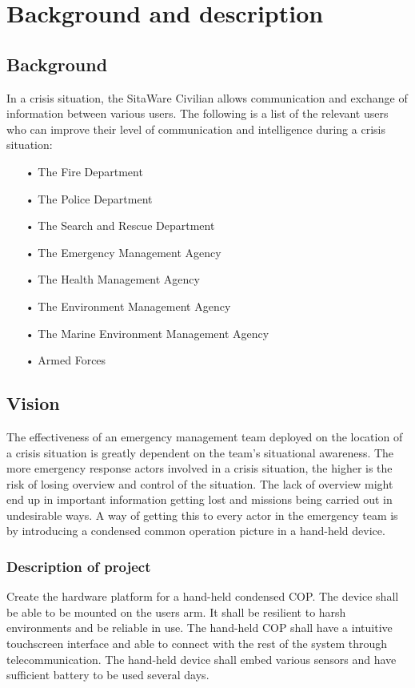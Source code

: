 \chapter{Background and description}
\section{Background}
In a crisis situation, the SitaWare Civilian allows communication and exchange of information between various users. The following is a list of the relevant users who can improve their level of communication and intelligence during a crisis situation:

\begin{enumerate}
\item[•] The Fire Department
\item[•] The Police Department
\item[•] The Search and Rescue Department
\item[•] The Emergency Management Agency
\item[•] The Health Management Agency
\item[•] The Environment Management Agency
\item[•] The Marine Environment Management Agency
\item[•] Armed Forces
\end{enumerate}

\section{Vision}
The effectiveness of an emergency management team deployed on the location of a crisis
situation is greatly dependent on the team’s situational awareness. The more emergency
response actors involved in a crisis situation, the higher is the risk of losing overview and
control of the situation. The lack of overview might end up in important information
getting lost and missions being carried out in undesirable ways.
A way of getting this to every actor in the emergency team is by introducing a condensed common operation picture in a hand-held device. 

\subsection{Description of project}
Create the hardware platform for a hand-held condensed COP. The device shall be able to be mounted on the users arm. It shall be resilient to harsh environments and be reliable in use. The hand-held COP shall have a intuitive touchscreen interface and able to connect with the rest of the system through telecommunication.
The hand-held device shall embed various sensors and have sufficient battery to be used several days. 

